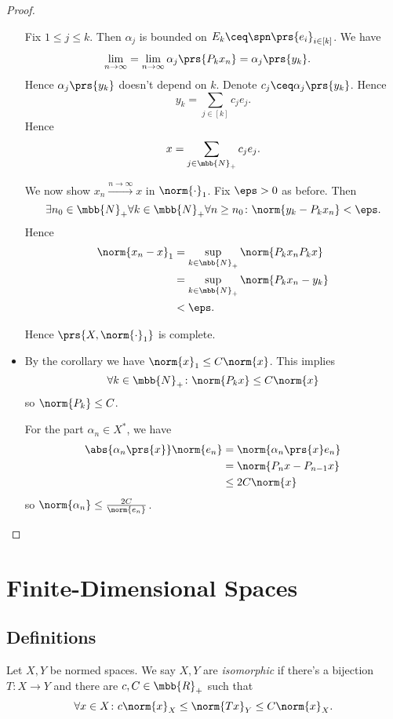 \documentclass[10pt, twoside]{book}
\begin{document}
\begin{proof}
\begin{itemize}
Fix $1 \leq j \leq k$. Then $\alpha_j$ is bounded on $E_k \ceq \spn\prs{e_i}_{i \in [k]}$.
We have
\begin{align*}
\lim_{n\to\infty} &= \lim_{n \to \infty} \alpha_j \prs{P_k x_n}
=
\alpha_j\prs{y_k} \text{.}
\end{align*}
Hence $\alpha_j\prs{y_k}$ doesn't depend on $k$. Denote $c_j \ceq \alpha_j\prs{y_k}$. Hence
\[y_k = \sum_{j\in[k]} c_j e_j \text{.}\]
Hence
\[x = \sum_{j \in \mbb{N}_+} c_j e_j \text{.}\]

We now show $x_n \xrightarrow{n\to\infty} x$ in $\norm{\cdot}_1$. Fix $\eps > 0$ as before. Then
\[\exists n_0 \in \mbb{N}_+ \forall k \in \mbb{N}_+ \forall n \geq n_0 \colon \norm{y_k - P_k x_n} < \eps \text{.}\]
Hence
\begin{align*}
\norm{x_n - x}_1 &= \sup_{k \in \mbb{N}_+} \norm{P_k x_n P_k x}
\\&= \sup_{k \in \mbb{N}_+} \norm{P_k x_n - y_k}
\\&< \eps \text{.}
\end{align*}

Hence $\prs{X, \norm{\cdot}_1}$ is complete.

\item By the corollary %
we have $\norm{x}_1 \leq C \norm{x}$.
This implies
\[\forall k \in \mbb{N}_+ \colon \norm{P_k x} \leq C \norm{x}\]
so
$\norm{P_k} \leq C$.

For the part $\alpha_n \in X^*$, we have
\begin{align*}
\abs{\alpha_n\prs{x}} \norm{e_n} &=
\norm{\alpha_n\prs{x} e_n}
\\&=
\norm{P_n x - P_{n-1} x}
\\&\leq
2 C \norm{x}
\end{align*}
so $\norm{\alpha_n} \leq \frac{2 C}{\norm{e_n}}$.
\end{itemize}
\end{proof}

\section{Finite-Dimensional Spaces}

\subsection{Definitions}

\begin{definition}
Let $X,Y$ be normed spaces.
We say $X,Y$ are \emph{isomorphic} if there's a bijection $T \colon X \to Y$ and there are $c, C \in \mbb{R}_+$ such that
\[\forall x \in X \colon c \norm{x}_X \leq \norm{Tx}_Y \leq C \norm{x}_X \text{.}\] 
\end{definition}
\end{document}
